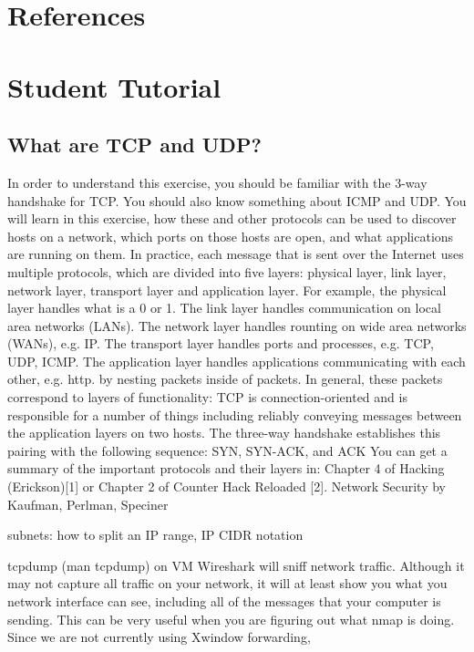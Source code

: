 \documentclass[11pt]{report}
\begin{document}
\section{References}


\section{Student Tutorial}
\subsection{ What are TCP and UDP?  }
In order to understand this exercise, you should be familiar with the 3-way handshake for TCP.
You should also know something about ICMP and UDP.
You will learn in this exercise, how these and other protocols can be used to discover hosts on a network,
which ports on those hosts are open, and what applications are running on them.
In practice, each message that is sent over the Internet 
uses multiple protocols, which are divided into five layers: physical layer, link layer, network layer,
transport layer and application layer.
For example, the physical layer handles what is a 0 or 1.
The link layer handles communication on local area networks (LANs).
The network layer handles rounting on wide area networks (WANs), e.g. IP.
The transport layer handles ports and processes, e.g. TCP, UDP, ICMP.
The application layer handles applications communicating with each other, e.g. http.
by nesting packets inside of packets.  In general,
these packets correspond to layers  of functionality:   
TCP is connection-oriented and is responsible for 
a number of things including reliably conveying messages between the application layers on two hosts.  
The three-way handshake establishes this pairing with the following sequence: SYN, SYN-ACK,  and ACK
You can get a summary of the important protocols and their layers in:
Chapter 4 of Hacking (Erickson)[1] or Chapter 2 of Counter Hack Reloaded [2].  
Network Security by Kaufman, Perlman, Speciner

subnets: how to split an IP range, IP CIDR notation

tcpdump (man tcpdump) on VM
Wireshark will sniff network traffic.  Although it may not capture 
all traffic on your network, it will at least show you what you network interface can see,
including all of the messages that your computer is sending.  
This can be very useful when you are figuring out what nmap is doing.  Since we are not
currently using Xwindow forwarding, 
\end{document}
